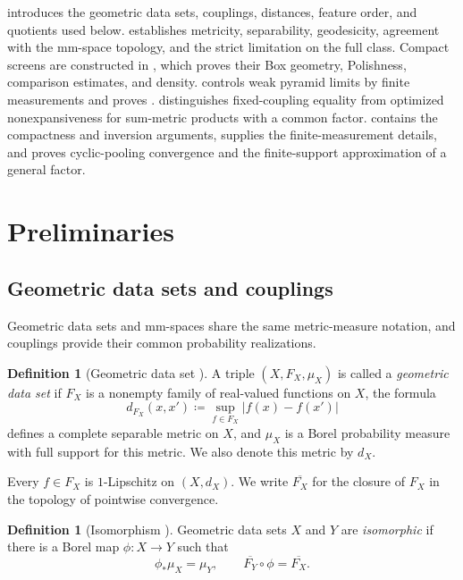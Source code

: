 \documentclass[11pt]{amsart}
\theoremstyle{plain}
\theoremstyle{definition}
\newtheorem{definition}[theorem]{Definition}
\theoremstyle{remark}
\begin{document}
 introduces the geometric data sets, couplings, distances, feature order, and quotients used below.  establishes metricity, separability, geodesicity, agreement with the mm-space topology, and the strict limitation on the full class. Compact screens are constructed in , which proves their Box geometry, Polishness, comparison estimates, and density.  controls weak pyramid limits by finite measurements and proves .  distinguishes fixed-coupling equality from optimized nonexpansiveness for sum-metric products with a common factor.  contains the compactness and inversion arguments,  supplies the finite-measurement details, and  proves cyclic-pooling convergence and the finite-support approximation of a general factor.

\section{Preliminaries}
\label{sec:preliminaries}

\subsection{Geometric data sets and couplings}
\label{subsec:gds-coupling}

Geometric data sets and mm-spaces share the same metric-measure notation, and couplings provide their common probability realizations.

\begin{definition}[Geometric data set {\cite[Definition~3.1]{hanika2022gds}}]
\label{def:gds}
A triple $(X,F_X,\mu_X)$ is called a \emph{geometric data set} if $F_X$ is a nonempty family of real-valued functions on $X$, the formula
\[d_{F_X}(x,x')\coloneqq\sup_{f\in F_X}|f(x)-f(x')|\]
defines a complete separable metric on $X$, and $\mu_X$ is a Borel probability measure with full support for this metric. We also denote this metric by $d_X$.
\end{definition}

Every $f\in F_X$ is $1$-Lipschitz on $(X,d_X)$. We write $\overline{F_X}$ for the closure of $F_X$ in the topology of pointwise convergence.

\begin{definition}[Isomorphism {\cite[Definition~3.2]{hanika2022gds}}]
\label{def:gds-isomorphism}
Geometric data sets $X$ and $Y$ are \emph{isomorphic} if there is a Borel map $\phi\colon X\to Y$ such that
\[\phi_*\mu_X=\mu_Y,\qquad \overline{F_Y}\circ\phi=\overline{F_X}.\]
\end{definition}
\end{document}
